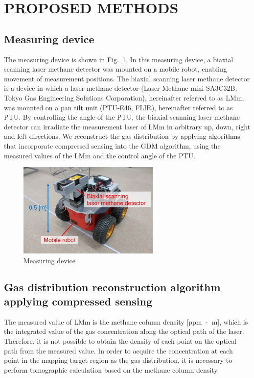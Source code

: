 \documentclass[fleqn,10pt,twocolumn]{SICE19}
\newcommand{\Figref}[1]{Fig.~\ref{#1}}
\begin{document}
\section{PROPOSED METHODS}\label{sec:proposed_methods}
\subsection{Measuring device}\label{subsec:system}
The measuring device is shown in \Figref{fig:robot}. In this measuring device, a biaxial scanning laser methane detector was mounted on a mobile robot, enabling movement of measurement positions. The biaxial scanning laser methane detector is a device in which a laser methane detector (Laser Methane mini SA3C32B, Tokyo Gas Engineering Solutions Corporation), hereinafter referred to as LMm, was mounted on a pan tilt unit (PTU-E46, FLIR), hereinafter referred to as PTU. By controlling the angle of the PTU, the biaxial scanning laser methane detector can irradiate the measurement laser of LMm in arbitrary up, down, right and left directions. We reconstruct the gas distribution by applying algorithms that incorporate compressed sensing into the GDM algorithm, using the measured values of the LMm and the control angle of the PTU.

\begin{figure}[h]
\begin{center}
\includegraphics[width=70mm]{robot.pdf}
\caption{\label{fig:robot} Measuring device}
\end{center}
\end{figure}


\subsection{Gas distribution reconstruction algorithm applying compressed sensing}\label{subsec:algorithm}
The measured value of LMm is the methane column density [ppm · m], which is the integrated value of the gas concentration along the optical path of the laser. Therefore, it is not possible to obtain the density of each point on the optical path from the measured value. In order to acquire the concentration at each point in the mapping target region as the gas distribution, it is necessary to perform tomographic calculation based on the methane column density.
\end{document}

